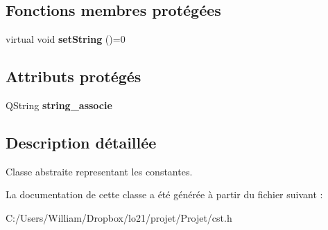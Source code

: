 \subsection*{Fonctions membres protégées}
\begin{DoxyCompactItemize}
\item 
\hypertarget{classcalcul_1_1_cst_aaad16363b75e0ae319b6a17bf0e53e44}{virtual void {\bfseries set\-String} ()=0}\label{classcalcul_1_1_cst_aaad16363b75e0ae319b6a17bf0e53e44}

\end{DoxyCompactItemize}
\subsection*{Attributs protégés}
\begin{DoxyCompactItemize}
\item 
\hypertarget{classcalcul_1_1_cst_ad4c38adf792d80b3a5c484ab382e6906}{Q\-String {\bfseries string\-\_\-associe}}\label{classcalcul_1_1_cst_ad4c38adf792d80b3a5c484ab382e6906}

\end{DoxyCompactItemize}


\subsection{Description détaillée}
Classe abstraite representant les constantes. 

La documentation de cette classe a été générée à partir du fichier suivant \-:\begin{DoxyCompactItemize}
\item 
C\-:/\-Users/\-William/\-Dropbox/lo21/projet/\-Projet/cst.\-h\end{DoxyCompactItemize}
